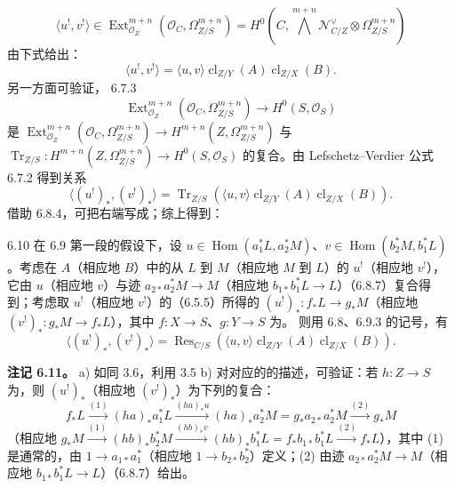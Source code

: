 \[\langle u^!,v^!\rangle\in\operatorname{Ext}_{\mathcal O_Z}^{m+n}(\mathcal O_C,\Omega^{m+n}_{Z/S})=H^0(C,\bigwedge^{m+n}\mathcal N_{C/Z}^{\vee}\otimes\Omega^{m+n}_{Z/S})\]
由下式给出：
\[\langle u^!,v^!\rangle=\langle u,v\rangle\operatorname{cl}_{Z/Y}(A)\operatorname{cl}_{Z/X}(B).\tag{6.9.4}\]
另一方面可验证， 6.7.3
\[\operatorname{Ext}_{\mathcal O_Z}^{m+n}(\mathcal O_C,\Omega^{m+n}_{Z/S})\longrightarrow H^0(S,\mathcal O_S)\]
是 $\operatorname{Ext}_{\mathcal O_Z}^{m+n}(\mathcal O_C,\Omega^{m+n}_{Z/S})\to H^{m+n}(Z,\Omega^{m+n}_{Z/S})$ 与 $\operatorname{Tr}_{Z/S}:H^{m+n}(Z,\Omega^{m+n}_{Z/S})\to H^0(S,\mathcal O_S)$ 的复合。由 Lefschetz--Verdier 公式 6.7.2 得到关系
\[\langle(u^!)_*,(v^!)_*\rangle=\operatorname{Tr}_{Z/S}(\langle u,v\rangle\operatorname{cl}_{Z/Y}(A)\operatorname{cl}_{Z/X}(B)).\tag{6.9.5}\]
借助 6.8.4，可把右端写成；综上得到：
\begin{SGAresult}{}{6.10}
在 6.9 第一段的假设下，设 $u\in\operatorname{Hom}(a_1^*L,a_2^*M)$、$v\in\operatorname{Hom}(b_2^*M,b_1^*L)$。考虑在 $A$（相应地 $B$）中的从 $L$ 到 $M$（相应地 $M$ 到 $L$）的 $u^!$（相应地 $v^!$），它由 $u$（相应地 $v$）与迹 $a_{2*}a_2^*M\to M$（相应地 $b_{1*}b_1^*L\to L$）（6.8.7）复合得到；考虑取 $u^!$（相应地 $v^!$）的（6.5.5）所得的 $(u^!)_*:f_*L\to g_*M$（相应地 $(v^!)_*:g_*M\to f_*L$），其中 $f:X\to S$、$g:Y\to S$ 为。
则用 6.8、6.9.3 的记号，有
\[\langle(u^!)_*,(v^!)_*\rangle=\operatorname{Res}_{C/S}(\langle u,v\rangle\operatorname{cl}_{Z/Y}(A)\operatorname{cl}_{Z/X}(B)).\tag{6.10.1}\]
\end{SGAresult}
\textbf{注记 6.11。} a) 如同 3.6，利用 3.5 b) 对对应的的描述，可验证：若 $h:Z\to S$ 为，则 $(u^!)_*$（相应地 $(v^!)_*$）为下列的复合：
\[f_*L\xrightarrow{(1)}(ha)_*a_1^*L\xrightarrow{(ha)_*u}(ha)_*a_2^*M=g_*a_{2*}a_2^*M\xrightarrow{(2)}g_*M\]
（相应地 $g_*M\xrightarrow{(1)}(hb)_*b_2^*M\xrightarrow{(hb)_*v}(hb)_*b_1^*L=f_*b_{1*}b_1^*L\xrightarrow{(2)}f_*L$），其中 (1) 是通常的，由 $1\to a_{1*}a_1^*$（相应地 $1\to b_{2*}b_2^*$）定义；(2) 由迹 $a_{2*}a_2^*M\to M$（相应地 $b_{1*}b_1^*L\to L$）（6.8.7）给出。

